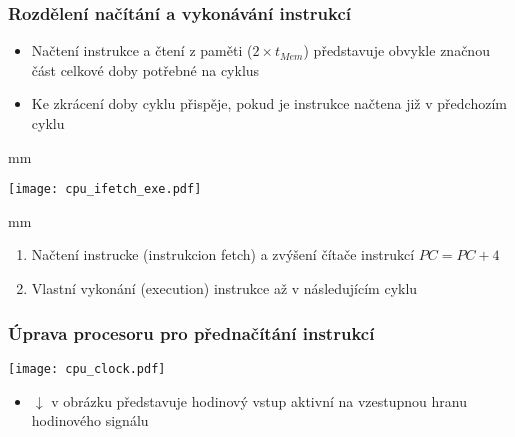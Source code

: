 \documentclass{beamer}
\begin{document}
\begin{frame}
\frametitle{Rozdělení načítání a vykonávání instrukcí}

\begin{itemize}
 \item Načtení instrukce a čtení z paměti ($2 \times t_{Mem}$) představuje obvykle značnou část celkové doby potřebné na cyklus
 \item Ke zkrácení doby cyklu přispěje, pokud je instrukce načtena již v předchozím cyklu
\end{itemize}

 mm

{
\centering
\texttt{[image: cpu\_ifetch\_exe.pdf]}
}

 mm

\begin{enumerate}
 \item Načtení instrucke (instrukcion fetch) a zvýšení čítače instrukcí $PC = PC + 4$
 \item Vlastní vykonání (execution) instrukce až v následujícím cyklu
\end{enumerate}

\end{frame}

\begin{frame}
\frametitle{Úprava procesoru pro přednačítání instrukcí}
\texttt{[image: cpu\_clock.pdf]}
\begin{itemize}
 \item $\downarrow$ v obrázku představuje hodinový vstup aktivní na vzestupnou hranu hodinového signálu
\end{itemize}

\end{frame}
\end{document}
